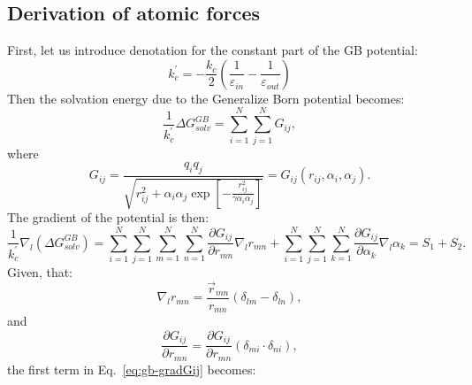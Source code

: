 \documentclass[11pt]{book}
\begin{document}

\subsection{Derivation of atomic forces}

First, let us introduce denotation for the constant part of the GB potential:
\begin{equation}\label{eq:gb-kc}
k_{c}^{\prime} = -\frac{k_{c}}{2}\left(\frac{1}{\varepsilon_{in}}-\frac{1}{\varepsilon_{out}}\right)
\end{equation}
Then the solvation energy due to the Generalize Born potential becomes:
\begin{equation}\label{eq:gb-deltaG}
\frac{1}{k_{c}^{\prime}}\Delta G_{solv}^{GB} = \sum_{i=1}^{N}\sum_{j=1}^{N}G_{ij},
\end{equation}
where
\begin{equation}\label{eq:gb-Gij}
G_{ij}=\frac{q_{i}q_{j}}{\sqrt{r_{ij}^{2}+\alpha_{i}\alpha_{j}\exp{\left[-\frac{r_{ij}^{2}}{\gamma\alpha_{i}\alpha_{j}}\right]}}}=G_{ij}(r_{ij},\alpha_{i},\alpha_{j}).
\end{equation}
The gradient of the potential is then:
\begin{equation}\label{eq:gb-gradGij}
\frac{1}{k_{c}^{\prime}}\nabla_{l}(\Delta G_{solv}^{GB})=\sum_{i=1}^{N}\sum_{j=1}^{N}\sum_{m=1}^{N}\sum_{n=1}^{N}\frac{\partial G_{ij}}{\partial r_{mn}}\nabla_{l}r_{mn}+\sum_{i=1}^{N}\sum_{j=1}^{N}\sum_{k=1}^{N}\frac{\partial G_{ij}}{\partial \alpha_{k}}\nabla_{l}\alpha_{k} = S_{1}+S_{2}.
\end{equation}
Given, that:
\begin{equation}\label{eq:gb-gradrmn}
\nabla_{l}r_{mn}=\frac{\vec{r}_{mn}}{r_{mn}}(\delta_{lm}-\delta_{ln}),
\end{equation}
and
\begin{equation}\label{eq:gb-partGij}
\frac{\partial G_{ij}}{\partial r_{mn}}=\frac{\partial G_{ij}}{\partial r_{mn}}(\delta_{mi}\cdot \delta_{ni}),
\end{equation}
the first term in Eq.~\ref{eq:gb-gradGij} becomes:
\end{document}
